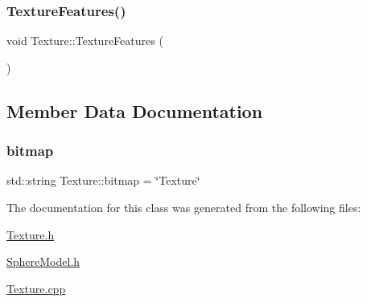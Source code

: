 \mbox{\label{class_texture_a8bd22c7780366ad3101d0f40df374866}} 
\subsubsection{\texorpdfstring{TextureFeatures()}{TextureFeatures()}}
{\footnotesize\ttfamily void Texture\+::\+Texture\+Features (\begin{DoxyParamCaption}{ }\end{DoxyParamCaption})}



\subsection{Member Data Documentation}
\mbox{\label{class_texture_a91a20f647be62bb66912167ce5e08ef6}} 
\subsubsection{\texorpdfstring{bitmap}{bitmap}}
{\footnotesize\ttfamily std\+::string Texture\+::bitmap = \char`\"{}Texture\char`\"{}}



The documentation for this class was generated from the following files\+:\begin{DoxyCompactItemize}
\item 
\mbox{\hyperlink{_texture_8h}{Texture.\+h}}\item 
\mbox{\hyperlink{_sphere_model_8h}{Sphere\+Model.\+h}}\item 
\mbox{\hyperlink{_texture_8cpp}{Texture.\+cpp}}\end{DoxyCompactItemize}
